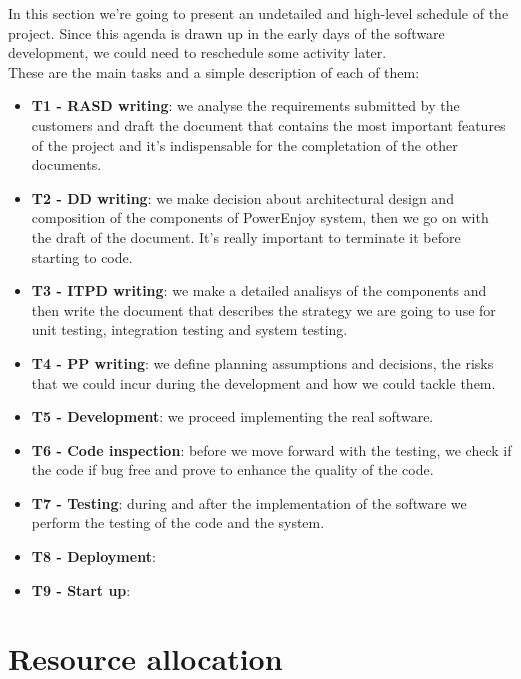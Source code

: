 \documentclass[english]{article}
\begin{document}
In this section we're going to present an undetailed and high-level schedule of the project. Since this agenda is drawn up in the early days of the software development, we could need to reschedule some activity later.\\
These are the main tasks and a simple description of each of them:

\begin{itemize}
	\item{\textbf{T1 - RASD writing}: we analyse the requirements submitted by the customers and draft the document that contains the most important features of the project and it's indispensable for the completation of the other documents.}
	
	\item{\textbf{T2 - DD writing}: we make decision about architectural design and composition of the components of PowerEnjoy system, then we go on with the draft of the document. It's really important to terminate it before starting to code.}

	\item{\textbf{T3 - ITPD writing}: we make a detailed analisys of the components and then write the document that describes the strategy we are going to use for unit testing, integration testing and system testing.}

	\item{\textbf{T4 - PP writing}: we define planning assumptions and decisions, the risks that we could incur during the development and how we could tackle them.}

	\item{\textbf{T5 - Development}: we proceed implementing the real software.}

	\item{\textbf{T6 - Code inspection}: before we move forward with the testing, we check if the code if bug free and prove to enhance the quality of the code.}

	\item{\textbf{T7 - Testing}: during and after the implementation of the software we perform the testing of the code and the system.}

	\item{\textbf{T8 - Deployment}: }

	\item{\textbf{T9 - Start up}: }
\end{itemize}



\section{Resource allocation}
\end{document}
